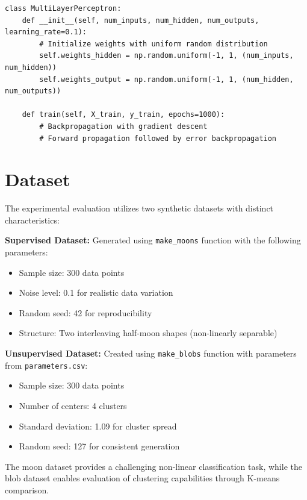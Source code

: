 \documentclass[11pt,a4paper]{article}
\begin{document}
\begin{lstlisting}[caption=MLP Class Architecture]
class MultiLayerPerceptron:
    def __init__(self, num_inputs, num_hidden, num_outputs, learning_rate=0.1):
        # Initialize weights with uniform random distribution
        self.weights_hidden = np.random.uniform(-1, 1, (num_inputs, num_hidden))
        self.weights_output = np.random.uniform(-1, 1, (num_hidden, num_outputs))
        
    def train(self, X_train, y_train, epochs=1000):
        # Backpropagation with gradient descent
        # Forward propagation followed by error backpropagation
\end{lstlisting}

\section{Dataset}

The experimental evaluation utilizes two synthetic datasets with distinct characteristics:

\textbf{Supervised Dataset:} Generated using \texttt{make\_moons} function with the following parameters:
\begin{itemize}
\item Sample size: 300 data points
\item Noise level: 0.1 for realistic data variation
\item Random seed: 42 for reproducibility
\item Structure: Two interleaving half-moon shapes (non-linearly separable)
\end{itemize}

\textbf{Unsupervised Dataset:} Created using \texttt{make\_blobs} function with parameters from \texttt{parameters.csv}:
\begin{itemize}
\item Sample size: 300 data points
\item Number of centers: 4 clusters
\item Standard deviation: 1.09 for cluster spread
\item Random seed: 127 for consistent generation
\end{itemize}

The moon dataset provides a challenging non-linear classification task, while the blob dataset enables evaluation of clustering capabilities through K-means comparison.
\end{document}
